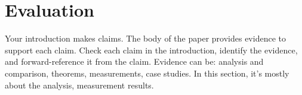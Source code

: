 
\section{Evaluation}
\label{sec:evaluation}

Your introduction makes claims. The body of the paper provides evidence to support each claim. Check each claim in the introduction, identify the evidence, and forward-reference it from the claim. Evidence can be: analysis and comparison, theorems, measurements, case studies. In this section, it's mostly about the analysis, measurement results.

